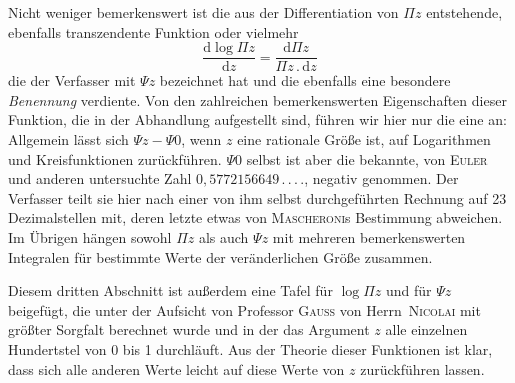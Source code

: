 Nicht weniger bemerkenswert ist die aus der Differentiation von $\Pi z$ entstehende, ebenfalls transzendente Funktion oder vielmehr
\[
\frac{\mathrm{d}\log\Pi z}{\mathrm{d}z}=\frac{\mathrm{d}\Pi z}{\Pi z\,.\,\mathrm{d}z}
\]
die der Verfasser mit $\Psi z$ bezeichnet hat und die ebenfalls eine besondere \textit{Benennung} verdiente. Von den zahlreichen bemerkenswerten Eigenschaften dieser Funktion, die in der Abhandlung aufgestellt sind, führen wir hier nur die eine an: Allgemein lässt sich $\Psi z-\Psi 0$, wenn $z$ eine rationale Größe ist, auf Logarithmen und Kreisfunktionen zurückführen. $\Psi 0$ selbst ist aber die bekannte, von \textsc{Euler} und anderen untersuchte Zahl $0{,}5772156649\,.\,.\,.\,.$, negativ genommen. Der Verfasser teilt sie hier nach einer von ihm selbst durchgeführten Rechnung %
auf 23 Dezimalstellen mit, deren letzte etwas von \textsc{Mascheroni}s Bestimmung abweichen. Im Übrigen hängen sowohl $\Pi z$ als auch $\Psi z$ mit mehreren bemerkenswerten Integralen für bestimmte Werte der veränderlichen Größe zusammen.

Diesem dritten Abschnitt ist außerdem eine Tafel für $\log\Pi z$ und für $\Psi z$ beigefügt, die unter der Aufsicht von Professor \textsc{Gauss} von Herrn\ \textsc{Nicolai} mit größter Sorgfalt berechnet wurde und in der das Argument $z$ alle einzelnen Hundertstel von 0 bis 1 durchläuft. Aus der Theorie dieser Funktionen ist klar, dass sich alle anderen Werte leicht auf diese Werte von $z$ zurückführen lassen.

